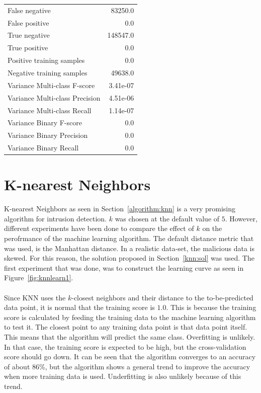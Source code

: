\begin{table}[H]
\begin{minipage}{0.5\textwidth}
\begin{tabular}{l r}
False negative & 83250.0 \\
False positive & 0.0 \\
True negative & 148547.0 \\
True positive & 0.0 \\
\midrule
Positive training samples & 0.0 \\
Negative training samples & 49638.0 \\
\midrule
Variance Multi-class F-score & 3.41e-07 \\
Variance Multi-class Precision & 4.51e-06 \\
Variance Multi-class Recall & 1.14e-07 \\
\midrule
Variance Binary F-score & 0.0 \\
Variance Binary Precision & 0.0 \\
Variance Binary Recall & 0.0 \\
\bottomrule
\end{tabular}
\end{minipage}
\end{table}

\section{K-nearest Neighbors}
K-nearest Neighbors as seen in Section~\ref{algorithm:knn} is a very promising algorithm for intrusion detection. $k$ was chosen at the default value of $5$.  However, different experiments have been done to compare the effect of $k$ on the perofrmance of the machine learning algorithm. The default distance metric that was used, is the Manhattan distance. In a realistic data-set, the malicious data is skewed. For this reason, the solution proposed in Section~\ref{knn:sol} was used. The first experiment that was done, was to construct the learning curve as seen in Figure~\ref{fig:knnlearn1}. \\
\\
Since KNN uses the $k$-closest neighbors and their distance to the to-be-predicted data point, it is normal that the training score is $1.0$. This is because the training score is calculated by feeding the training data to the machine learning algorithm to test it. The closest point to any training data point is that data point itself. This means that the algorithm will predict the same class. Overfitting is unlikely. In that case, the training score is expected to be high, but the cross-validation score should go down. It can be seen that the algorithm converges to an accuracy of about 86\%, but the algorithm shows a general trend to improve the accuracy when more training data is used. Underfitting is also unlikely because of this trend. 

